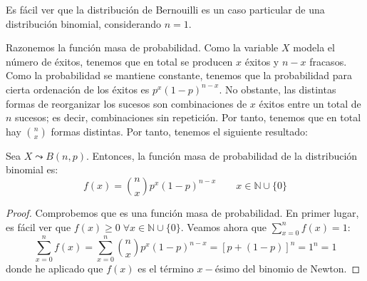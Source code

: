 \begin{observacion}
    Es fácil ver que la distribución de Bernouilli es un caso particular de una distribución binomial, considerando $n=1$.
\end{observacion}

Razonemos la función masa de probabilidad. Como la variable $X$ modela el número de éxitos, tenemos que en total se producen $x$ éxitos y $n-x$ fracasos. Como la probabilidad se mantiene constante, tenemos que la probabilidad para cierta ordenación de los éxitos es $p^x(1-p)^{n-x}$. No obstante, las distintas formas de reorganizar los sucesos son combinaciones de $x$ éxitos entre un total de $n$ sucesos; es decir, combinaciones sin repetición. Por tanto, tenemos que en total hay $\binom{n}{x}$ formas distintas. Por tanto, tenemos el siguiente resultado:
\begin{prop}
    Sea $X\leadsto B(n,p)$. Entonces, la función masa de probabilidad de la distribución binomial es:
    \begin{equation*}
        f(x) = \binom{n}{x}p^x (1-p)^{n-x} \qquad x\in \mathbb{N}\cup \{0\}
    \end{equation*}
\end{prop}
\begin{proof}
    Comprobemos que es una función masa de probabilidad. En primer lugar, es fácil ver que $f(x)\geq 0\;\forall x\in \mathbb{N}\cup \{0\}$. Veamos ahora que $\sum\limits_{x=0}^n f(x)=1$:
    \begin{equation*}
        \sum_{x=0}^n f(x)
        = \sum_{x=0}^n \binom{n}{x}p^x (1-p)^{n-x}
        = [p + (1-p)]^n = 1^n = 1
    \end{equation*}
    donde he aplicado que $f(x)$ es el término $x-$ésimo del binomio de Newton.
\end{proof}


